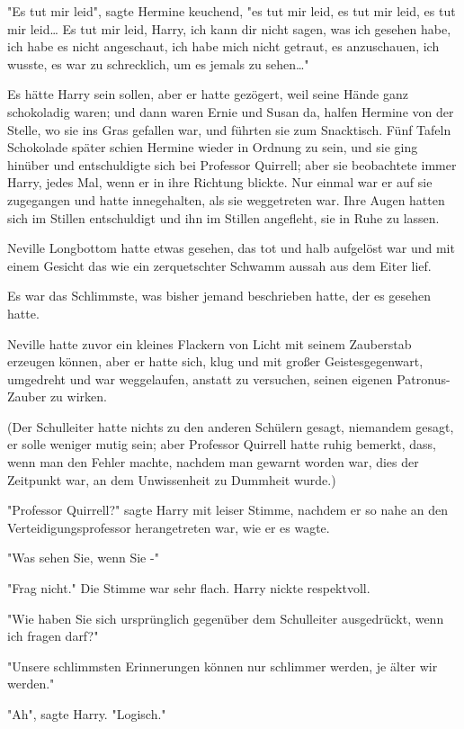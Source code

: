 {"Es tut mir leid", sagte Hermine keuchend, "es tut mir leid, es tut mir leid, es tut mir leid… Es tut mir leid, Harry, ich kann dir nicht sagen, was ich gesehen habe, ich habe es nicht angeschaut, ich habe mich nicht getraut, es anzuschauen, ich wusste, es war zu schrecklich, um es jemals zu sehen…"

Es hätte Harry sein sollen, aber er hatte gezögert, weil seine Hände ganz schokoladig waren; und dann waren Ernie und Susan da, halfen Hermine von der Stelle, wo sie ins Gras gefallen war, und führten sie zum Snacktisch. Fünf Tafeln Schokolade später schien Hermine wieder in Ordnung zu sein, und sie ging hinüber und entschuldigte sich bei Professor Quirrell; aber sie beobachtete immer Harry, jedes Mal, wenn er in ihre Richtung blickte. Nur einmal war er auf sie zugegangen und hatte innegehalten, als sie weggetreten war. Ihre Augen hatten sich im Stillen entschuldigt und ihn im Stillen angefleht, sie in Ruhe zu lassen.

Neville Longbottom hatte etwas gesehen, das tot und halb aufgelöst war und mit einem Gesicht das wie ein zerquetschter Schwamm aussah aus dem Eiter lief.

Es war das Schlimmste, was bisher jemand beschrieben hatte, der es gesehen hatte.

Neville hatte zuvor ein kleines Flackern von Licht mit seinem Zauberstab erzeugen können, aber er hatte sich, klug und mit großer Geistesgegenwart, umgedreht und war weggelaufen, anstatt zu versuchen, seinen eigenen Patronus-Zauber zu wirken.

(Der Schulleiter hatte nichts zu den anderen Schülern gesagt, niemandem gesagt, er solle weniger mutig sein; aber Professor Quirrell hatte ruhig bemerkt, dass, wenn man den Fehler machte, nachdem man gewarnt worden war, dies der Zeitpunkt war, an dem Unwissenheit zu Dummheit wurde.)

"Professor Quirrell?" sagte Harry mit leiser Stimme, nachdem er so nahe an den Verteidigungsprofessor herangetreten war, wie er es wagte.

"Was sehen Sie, wenn Sie -"

"Frag nicht." Die Stimme war sehr flach. Harry nickte respektvoll.

"Wie haben Sie sich ursprünglich gegenüber dem Schulleiter ausgedrückt, wenn ich fragen darf?"

"Unsere schlimmsten Erinnerungen können nur schlimmer werden, je älter wir werden."

"Ah", sagte Harry. "Logisch."

}
